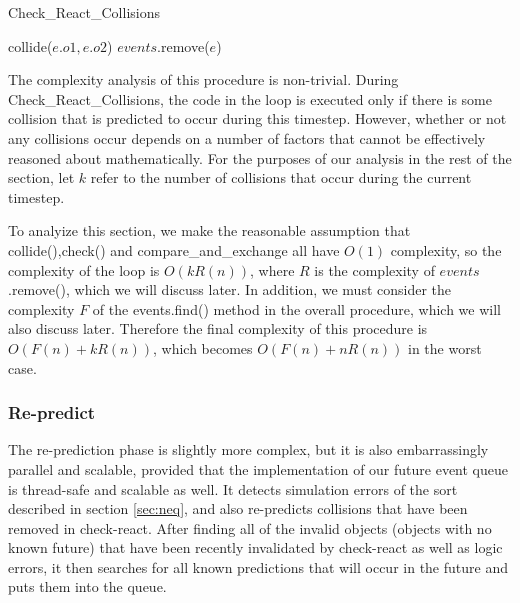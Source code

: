 \documentclass[CEJCS,PDF]{cej} %
\begin{document}
\begin{algorithm}
\caption{Check\_React\_Collisions}
\begin{algorithmic}
\STATE {}
	\STATE {}
		\STATE {}
			\STATE {}
			\STATE collide($e.o1,e.o2$)
		\ENDIF
		\STATE {}
		\STATE $events$.remove($e$)
	\ENDIF
\ENDFOR
\end{algorithmic}
\end{algorithm}

The complexity analysis of this procedure is non-trivial.  During Check\_React\_Collisions, the code in the loop is executed only if there is 
some collision that is predicted to occur during this timestep.  However, whether or not any collisions occur depends on a number of factors that
cannot be effectively reasoned about mathematically. For the purposes of our analysis in the rest of the section, let $k$ refer to the number 
of collisions that occur during the current timestep.  

To analyize this section, we make the reasonable assumption that collide(),check() and compare\_and\_exchange all have $O(1)$ complexity, so the complexity
of the loop is $O(k R(n))$, where $R$ is the complexity of $events$.remove(), which we will discuss later.  In addition, we must consider the complexity $F$
of the events.find() method in the overall procedure, which we will also discuss later.  Therefore the final complexity of this procedure is $O(F(n)+k R(n))$, which
becomes $O(F(n)+n R(n))$ in the worst case.

\subsubsection{Re-predict}
\label{sec:repredict}
The re-prediction phase is slightly more complex, but it is also embarrassingly parallel and scalable, provided that the implementation of our future event queue is thread-safe and scalable as well.  It detects simulation errors of the sort described in section \ref{sec:neq}, and also re-predicts collisions
that have been removed in check-react.  After finding all of the invalid objects (objects with no known future) that have been recently invalidated by check-react as well as logic errors, it then
searches for all known predictions that will occur in the future and puts them into the queue.  
\end{document}
